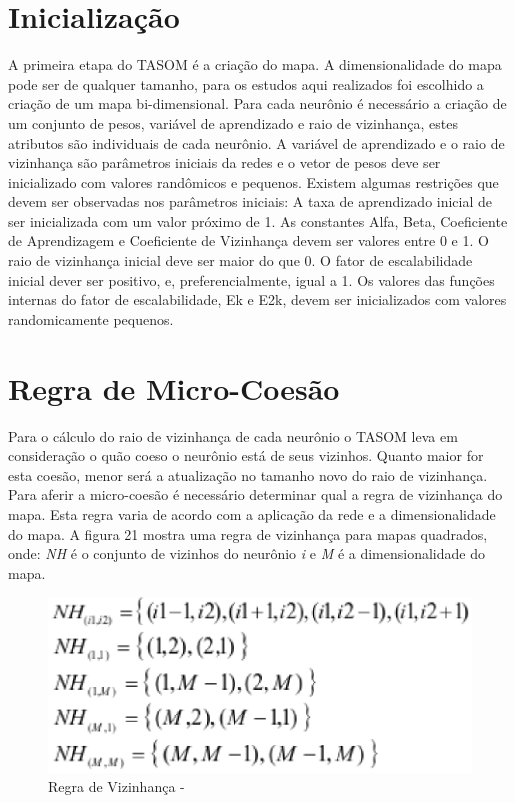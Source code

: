 \section{Inicialização}
A primeira etapa do TASOM é a criação do mapa. A dimensionalidade do mapa pode ser de qualquer tamanho, para os estudos aqui realizados foi escolhido a criação de um mapa bi-dimensional. Para cada neurônio é necessário a criação de um conjunto de pesos, variável de aprendizado e raio de vizinhança, estes atributos são individuais de cada neurônio. A variável de aprendizado e o raio de vizinhança são parâmetros iniciais da redes e o vetor de pesos deve ser inicializado com valores randômicos e pequenos. Existem algumas restrições que devem ser observadas nos parâmetros iniciais: A taxa de aprendizado inicial de ser inicializada com um valor próximo de 1. As constantes Alfa, Beta, Coeficiente de Aprendizagem e Coeficiente de Vizinhança devem ser valores entre 0 e 1. O raio de vizinhança inicial deve ser maior do que 0. O fator de escalabilidade inicial dever ser positivo, e, preferencialmente, igual a 1. Os valores das funções internas do fator de escalabilidade, Ek e E2k, devem ser inicializados com valores randomicamente pequenos. 

\section{Regra de Micro-Coesão}
Para o cálculo do raio de vizinhança de cada neurônio o TASOM leva em consideração o quão coeso o neurônio está de seus vizinhos. Quanto maior for esta coesão, menor será a atualização no tamanho novo do raio de vizinhança. Para aferir a micro-coesão é necessário determinar qual a regra de vizinhança do mapa. Esta regra varia de acordo com a aplicação da rede e a dimensionalidade do mapa. A figura 21 mostra uma regra de vizinhança para mapas quadrados, onde: \textit{NH} é o conjunto de vizinhos do neurônio \textit{i} e \textit{M} é a dimensionalidade do mapa. 


\begin{figure}[!h]
\centering
\includegraphics[keepaspectratio=true,scale=0.50]
{figuras/dimensionalidade.eps}
\caption{Regra de Vizinhança - }
\label{data_titatic}
\end{figure}

